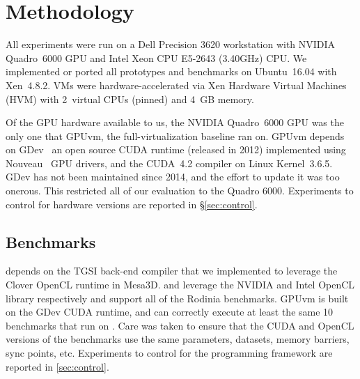 \section{Methodology}
\label{sec_method}

All experiments were run on a Dell Precision 3620 workstation with NVIDIA
Quadro~6000 GPU and Intel Xeon CPU E5-2643 (3.40GHz) CPU. We implemented or
ported all prototypes and benchmarks on Ubuntu~16.04 with Xen~4.8.2. VMs were
hardware-accelerated via Xen Hardware Virtual Machines (HVM) with 2~virtual
CPUs (pinned) and 4~GB memory.

Of the GPU hardware available to us, the NVIDIA Quadro~6000 GPU was the only
one that GPUvm, the full-virtual\-ization baseline ran on. GPUvm depends on
GDev~\cite{gdev} an open source CUDA runtime (released in 2012) implemented
using Nouveau~\cite{nouveau} GPU drivers, and the CUDA~4.2 compiler on Linux
Kernel~3.6.5. GDev has not been maintained since 2014, and the effort to
update it was too onerous. This restricted all of our evaluation to the Quadro
6000. Experiments to control for hardware versions are reported in
\S\ref{sec:control}.

\subsection{Benchmarks}
\XenSVGA depends on the TGSI back-end compiler that we implemented to leverage
the Clover OpenCL runtime in Mesa3D. \apigpu and \apicpu leverage the NVIDIA
and Intel OpenCL library respectively and support all of the Rodinia
benchmarks. GPUvm is built on the GDev CUDA runtime, and can correctly execute
at least the same 10 benchmarks that run on \XenSVGA. Care was taken to ensure
that the CUDA and OpenCL versions of the benchmarks use the same parameters,
datasets, memory barriers, sync points, etc. Experiments to control for the
programming framework are reported in \ref{sec:control}.


\newcommand{\RowColor}{\rowcolor{red!50} \cellcolor{white}}
\newcommand{\NewBncColor}{\cellcolor{green!25}}
\newcommand{\FailBncColor}{\cellcolor{gray!50}}

